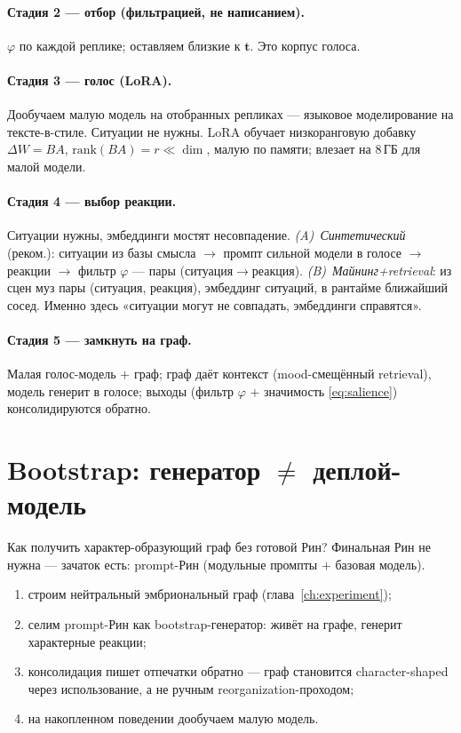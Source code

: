 \paragraph{Стадия 2 — отбор (фильтрацией, не написанием).}
$\varphi$ по каждой реплике; оставляем близкие к $\mathbf{t}$. Это корпус голоса.

\paragraph{Стадия 3 — голос (LoRA).}
Дообучаем малую модель на отобранных репликах — языковое моделирование на
тексте-в-стиле. Ситуации не нужны. LoRA обучает низкоранговую добавку
$\Delta W = BA$, $\mathrm{rank}(BA)=r\ll\dim$, малую по памяти; влезает на $8$\,ГБ
для малой модели.

\paragraph{Стадия 4 — выбор реакции.}
Ситуации нужны, эмбеддинги мостят несовпадение.
\emph{(A)~Синтетический} (реком.): ситуации из базы смысла $\to$ промпт сильной
модели в голосе $\to$ реакции $\to$ фильтр $\varphi$ — пары
(ситуация$\to$реакция).
\emph{(B)~Майнинг+retrieval}: из сцен муз пары (ситуация, реакция), эмбеддинг
ситуаций, в рантайме ближайший сосед. Именно здесь «ситуации могут не совпадать,
эмбеддинги справятся».

\paragraph{Стадия 5 — замкнуть на граф.}
Малая голос-модель $+$ граф; граф даёт контекст (mood-смещённый retrieval), модель
генерит в голосе; выходы (фильтр $\varphi$ $+$ значимость \eqref{eq:salience})
консолидируются обратно.

\section{Bootstrap: генератор $\ne$ деплой-модель}

Как получить характер-образующий граф без готовой Рин? Финальная Рин не нужна —
зачаток есть: prompt-Рин (модульные промпты $+$ базовая модель).

\begin{enumerate}
\item строим нейтральный эмбриональный граф (глава~\ref{ch:experiment});
\item селим prompt-Рин как bootstrap-генератор: живёт на графе, генерит характерные
реакции;
\item консолидация пишет отпечатки обратно — граф становится character-shaped через
использование, а не ручным reorganization-проходом;
\item на накопленном поведении дообучаем малую модель.
\end{enumerate}

